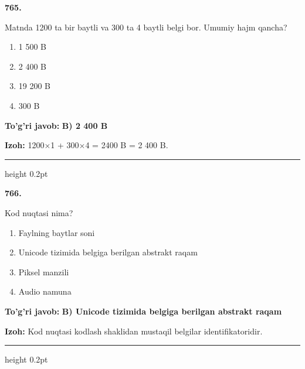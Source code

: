\documentclass[10pt,a4paper,oneside]{article}
\begin{document}
\noindent\textbf{\color{ink}765.}
\par
Matnda 1200 ta bir baytli va 300 ta 4 baytli belgi bor. Umumiy hajm qancha?
\begin{enumerate}[label=\Alph*),leftmargin=9mm]
\item 1 500 B
\item 2 400 B
\item 19 200 B
\item 300 B
\end{enumerate}
\begin{tcolorbox}[enhanced,breakable,colback=teal!4,colframe=teal!50!black,boxrule=0.5pt,arc=1.1mm,left=3mm,right=3mm,top=1.7mm,bottom=1.7mm,before skip=2mm,after skip=2mm]
\textbf{\color{teal}To'g'ri javob:} \textbf{B) 2 400 B}
\par\smallskip
\textbf{Izoh:} 1200\ensuremath{\times}1 + 300\ensuremath{\times}4 = 2400 B = 2 400 B.
\end{tcolorbox}
\vspace{2mm}\hrule height 0.2pt \vspace{3mm}

\noindent\textbf{\color{ink}766.}
\par
Kod nuqtasi nima?
\begin{enumerate}[label=\Alph*),leftmargin=9mm]
\item Faylning baytlar soni
\item Unicode tizimida belgiga berilgan abstrakt raqam
\item Piksel manzili
\item Audio namuna
\end{enumerate}
\begin{tcolorbox}[enhanced,breakable,colback=teal!4,colframe=teal!50!black,boxrule=0.5pt,arc=1.1mm,left=3mm,right=3mm,top=1.7mm,bottom=1.7mm,before skip=2mm,after skip=2mm]
\textbf{\color{teal}To'g'ri javob:} \textbf{B) Unicode tizimida belgiga berilgan abstrakt raqam}
\par\smallskip
\textbf{Izoh:} Kod nuqtasi kodlash shaklidan mustaqil belgilar identifikatoridir.
\end{tcolorbox}
\vspace{2mm}\hrule height 0.2pt \vspace{3mm}
\end{document}

